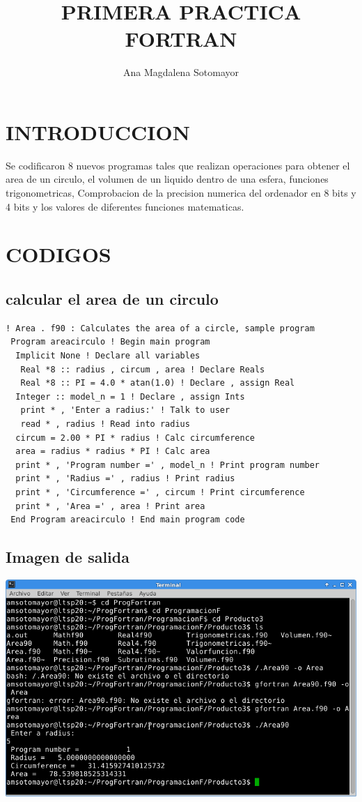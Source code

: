 \documentclass[letterpaper,10pt,twoside,onecolumn]{article}
\begin{document}
 
\title{PRIMERA PRACTICA FORTRAN} 
\author{Ana Magdalena Sotomayor} 

\maketitle 
\section{INTRODUCCION}
Se codificaron 8 nuevos programas tales que realizan operaciones para obtener el area de un circulo, el volumen de un liquido dentro de una esfera, funciones trigonometricas, Comprobacion de la precision numerica del ordenador en 8 bits y 4 bits y los valores de diferentes funciones matematicas.

\section{CODIGOS} 
\subsection{calcular el area de un circulo}
\begin{verbatim}
! Area . f90 : Calculates the area of a circle, sample program
 Program areacirculo ! Begin main program
  Implicit None ! Declare all variables
   Real *8 :: radius , circum , area ! Declare Reals
   Real *8 :: PI = 4.0 * atan(1.0) ! Declare , assign Real
  Integer :: model_n = 1 ! Declare , assign Ints
   print * , 'Enter a radius:' ! Talk to user
   read * , radius ! Read into radius
  circum = 2.00 * PI * radius ! Calc circumference
  area = radius * radius * PI ! Calc area
  print * , 'Program number =' , model_n ! Print program number
  print * , 'Radius =' , radius ! Print radius
  print * , 'Circumference =' , circum ! Print circumference
  print * , 'Area =' , area ! Print area
 End Program areacirculo ! End main program code
\end{verbatim}

\subsection{Imagen de salida}
\includegraphics[scale=.75]{Area.png}
\end{document}
